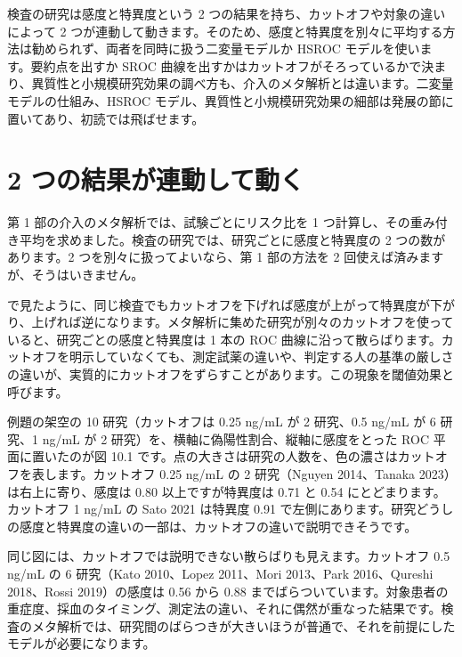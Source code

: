 \begin{chapintro}
検査の研究は感度と特異度という 2 つの結果を持ち、カットオフや対象の違いによって 2 つが連動して動きます。そのため、感度と特異度を別々に平均する方法は勧められず、両者を同時に扱う二変量モデルか HSROC モデルを使います。要約点を出すか SROC 曲線を出すかはカットオフがそろっているかで決まり、異質性と小規模研究効果の調べ方も、介入のメタ解析とは違います。二変量モデルの仕組み、HSROC モデル、異質性と小規模研究効果の細部は発展の節に置いてあり、初読では飛ばせます。
\end{chapintro}

\section{2 つの結果が連動して動く}
\label{sec:10-1}

第 1 部の介入のメタ解析では、試験ごとにリスク比を 1 つ計算し、その重み付き平均を求めました。検査の研究では、研究ごとに感度と特異度の 2 つの数があります。2 つを別々に扱ってよいなら、第 1 部の方法を 2 回使えば済みますが、そうはいきません。

で見たように、同じ検査でもカットオフを下げれば感度が上がって特異度が下がり、上げれば逆になります。メタ解析に集めた研究が別々のカットオフを使っていると、研究ごとの感度と特異度は 1 本の ROC 曲線に沿って散らばります。カットオフを明示していなくても、測定試薬の違いや、判定する人の基準の厳しさの違いが、実質的にカットオフをずらすことがあります。この現象を閾値効果と呼びます。

例題の架空の 10 研究（カットオフは 0.25 ng/mL が 2 研究、0.5 ng/mL が 6 研究、1 ng/mL が 2 研究）を、横軸に偽陽性割合、縦軸に感度をとった ROC 平面に置いたのが図 10.1 です。点の大きさは研究の人数を、色の濃さはカットオフを表します。カットオフ 0.25 ng/mL の 2 研究（Nguyen 2014、Tanaka 2023）は右上に寄り、感度は 0.80 以上ですが特異度は 0.71 と 0.54 にとどまります。カットオフ 1 ng/mL の Sato 2021 は特異度 0.91 で左側にあります。研究どうしの感度と特異度の違いの一部は、カットオフの違いで説明できそうです。


同じ図には、カットオフでは説明できない散らばりも見えます。カットオフ 0.5 ng/mL の 6 研究（Kato 2010、Lopez 2011、Mori 2013、Park 2016、Qureshi 2018、Rossi 2019）の感度は 0.56 から 0.88 までばらついています。対象患者の重症度、採血のタイミング、測定法の違い、それに偶然が重なった結果です。検査のメタ解析では、研究間のばらつきが大きいほうが普通で、それを前提にしたモデルが必要になります。

